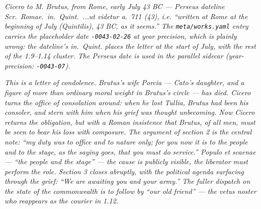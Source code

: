 
\textit{Cicero to M. Brutus, from Rome, early July 43 BC
--- Perseus dateline \textit{Scr.~Romae.~in.~Quint.~...ut
videtur a.~711 (43)}, i.e. ``written at Rome at the
beginning of July (Quintilis), 43 BC, as it seems.'' The
\texttt{meta/works.yaml} entry carries the placeholder
date \texttt{-0043-02-26} at year precision, which is
plainly wrong: the dateline's \textit{in.~Quint.} places
the letter at the start of July, with the rest of the
1.9--1.14 cluster. The Perseus date is used in the
parallel sidecar (year-precision: \texttt{-0043-07}).}

\textit{This is a letter of condolence. Brutus's wife
Porcia --- Cato's daughter, and a figure of more than
ordinary moral weight in Brutus's circle --- has died.
Cicero turns the office of consolation around: when
\textit{he} lost Tullia, Brutus had been his consoler,
and stern with him when his grief was thought
unbecoming. Now Cicero returns the obligation, but with
a Roman insistence that Brutus, of all men, must be
seen to bear his loss with composure. The argument of
section 2 is the central note: ``my duty was to office
and to nature only; for you now it is to the people and
to the stage, as the saying goes, that you must do
service.'' \textit{Populo et scaenae} --- ``the people
and the stage'' --- the cause is publicly visible, the
liberator must perform the role. Section 3 closes
abruptly, with the political agenda surfacing through
the grief: ``We are awaiting you and your army.'' The
fuller dispatch on the state of the commonwealth is to
follow by ``our old friend'' --- the \textit{vetus
noster} who reappears as the courier in 1.12.}
